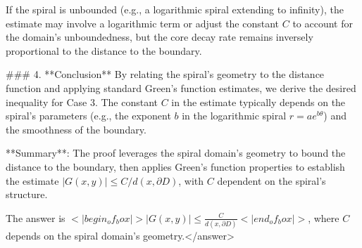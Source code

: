 If the spiral is unbounded (e.g., a logarithmic spiral extending to infinity), the estimate may involve a logarithmic term or adjust the constant \( C \) to account for the domain's unboundedness, but the core decay rate remains inversely proportional to the distance to the boundary.  


### 4. **Conclusion**  
By relating the spiral's geometry to the distance function and applying standard Green's function estimates, we derive the desired inequality for Case 3. The constant \( C \) in the estimate typically depends on the spiral's parameters (e.g., the exponent \( b \) in the logarithmic spiral \( r = a e^{b\theta} \)) and the smoothness of the boundary.  

**Summary**: The proof leverages the spiral domain's geometry to bound the distance to the boundary, then applies Green's function properties to establish the estimate \( |G(x, y)| \leq C / d(x, \partial D) \), with \( C \) dependent on the spiral's structure.  

The answer is \(<|begin_of_box|>|G(x, y)| \leq \frac{C}{d(x, \partial D)}<|end_of_box|>\), where \( C \) depends on the spiral domain's geometry.</answer>